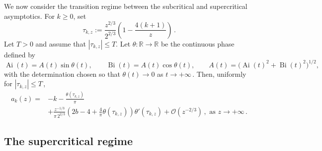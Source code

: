 \documentclass[11pt]{amsart}
\numberwithin{equation}{section}
\theoremstyle{remark}
\newcommand{\Ai}{\operatorname{Ai}}
\newcommand{\Bi}{\operatorname{Bi}}
\begin{document}
We now consider the transition regime between the subcritical
and supercritical asymptotics. For $k\geq0$, set
\begin{equation}\label{eq:kummer-tau-transition}
	\tau_{k,z}
	:=
	\frac{z^{2/3}}{2^{2/3}}
	\left(
	1-\frac{4(k+1)}{z}
	\right)\,.
\end{equation}
Let $T>0$ and assume that
$
|\tau_{k,z}|\leq T.
$
Let $\theta:\mathbb R\to\mathbb R$ be the continuous phase defined by
\begin{equation}\label{eq:kummer-Airy-phase}
	\Ai(t)=A(t)\sin\theta(t),
	\qquad
	\Bi(t)=A(t)\cos\theta(t),
	\qquad
	A(t)=\bigl(\Ai(t)^2+\Bi(t)^2\bigr)^{1/2},
\end{equation}
with the determination chosen so that
$\theta(t)\to0$ as $t\to+\infty\,$.
Then, uniformly for $|\tau_{k,z}|\leq T\,$,
\begin{equation}\label{eq:kummer-transition}
	\begin{aligned}
		a_k(z)
		={}&
		-k-\frac{\theta(\tau_{k,z})}{\pi}
		\\
		&+
		\frac{z^{-1/3}}{\pi\,2^{2/3}}
		\left(
		2b-4+\frac{4}{\pi}\theta(\tau_{k,z})
		\right)
		\theta'(\tau_{k,z})
		+\mathcal O(z^{-2/3})\,,
		\mbox{ as }  z\to+\infty\,.
	\end{aligned}
\end{equation}




\subsection{The supercritical regime}
\end{document}
